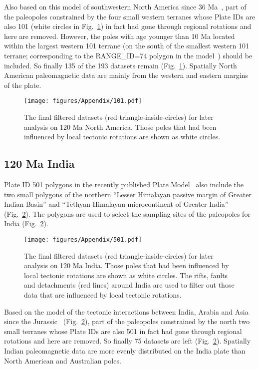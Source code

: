 Also based on this model of southwestern North America since 36 Ma~\cite{Mc06},
part of the paleopoles constrained by the four small western terranes whose
Plate IDs are also 101 (white circles in Fig.~\ref{fig_NAfinal}) in fact had gone through regional
rotations and here are removed. However, the poles with age younger than 10 Ma
located within the largest western 101 terrane (on the south of the smallest
western 101 terrane; corresponding to the RANGE\_ID=74 polygon in the
model~\cite{Mc06}) should be included. So finally 135 of the 193 datasets remain
(Fig.~\ref{fig_NAfinal}). Spatially North American paleomagnetic data are mainly
from the western and eastern margins of the plate.

\begin{figure}
\texttt{[image: figures/Appendix/101.pdf]}
\caption{The final filtered datasets (red triangle-inside-circles) for later
analysis on 120 Ma North America. Those poles that had been
influenced by local tectonic rotations are shown as white
circles.}\label{fig_NAfinal}
\end{figure}

\subsection{120 Ma India}

Plate ID 501 polygons in the recently published Plate Model~\cite{Y18} also
include the two small polygons of the northern ``Lesser Himalayan passive
margin of Greater Indian Basin'' and ``Tethyan Himalayan microcontinent of
Greater India'' (Fig.~\ref{fig_INfinal}). The polygons are used to select the
sampling sites of the paleopoles for India (Fig.~\ref{fig_INfinal}).

\begin{figure}
\texttt{[image: figures/Appendix/501.pdf]}
\caption{The final filtered datasets (red triangle-inside-circles) for later
analysis on 120 Ma India. Those poles that had been influenced by
local tectonic rotations are shown as white circles. The rifts, faults and
detachments (red lines) around India are used to filter out those data that
are influenced by local tectonic rotations.}\label{fig_INfinal}
\end{figure}

Based on the model of the tectonic interactions between India, Arabia and Asia
since the Jurassic~\cite{G15} (Fig.~\ref{fig_INfinal}), part of the paleopoles
constrained by the north two small terranes whose Plate IDs are also 501 in fact
had gone through regional rotations and here are removed. So finally 75 datasets
are left (Fig.~\ref{fig_INfinal}). Spatially Indian paleomagnetic data are more
evenly distributed on the India plate than North American and Australian poles.

